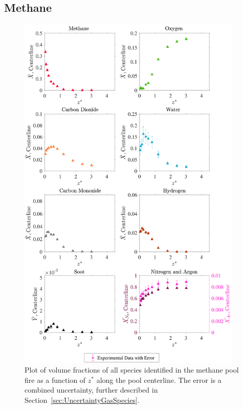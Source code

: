 \documentclass[12pt]{article}
\begin{document}
\subsection{Methane}
\label{ssec:Methane_ALL_Vol_Frac}
\begin{figure}[!h]
	\centering
\includegraphics[width=10.75cm,keepaspectratio]{Methane_MOL_FRAC_Plot.pdf}
	\caption[Volume fractions of major species in the methane plume]{Plot of volume fractions of all species identified in the methane pool fire as a function of $z^{*}$ along the pool centerline. The error is a combined uncertainty, further described in Section~\ref{sec:UncertaintyGasSpecies}.}
	\label{fig:Methane_VOL_Frac_Major}
\end{figure}
\end{document}
